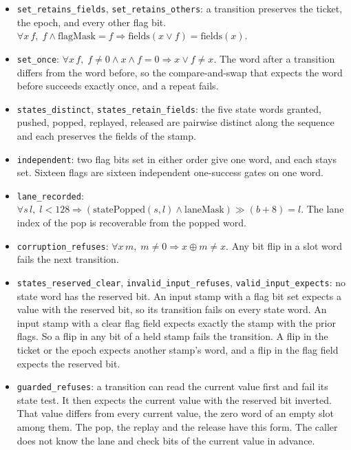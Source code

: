 \begin{itemize}
\item \texttt{set\_\allowbreak{}retains\_\allowbreak{}fields}, \texttt{set\_\allowbreak{}retains\_\allowbreak{}others}: a transition preserves the ticket, the epoch, and every other flag bit. \(\forall x\, f,\; f \land \mathrm{flagMask} = f \Rightarrow \mathrm{fields}(x \lor f) = \mathrm{fields}(x)\).
\item \texttt{set\_\allowbreak{}once}: \(\forall x\, f,\; f \neq 0 \land x \land f = 0 \Rightarrow x \lor f \neq x\). The word after a transition differs from the word before, so the compare-and-swap that expects the word before succeeds exactly once, and a repeat fails.
\item \texttt{states\_\allowbreak{}distinct}, \texttt{states\_\allowbreak{}retain\_\allowbreak{}fields}: the five state words granted, pushed, popped, replayed, released are pairwise distinct along the sequence and each preserves the fields of the stamp.
\item \texttt{independent}: two flag bits set in either order give one word, and each stays set. Sixteen flags are sixteen independent one-success gates on one word.
\item \texttt{lane\_\allowbreak{}recorded}: \(\forall s\, l,\; l < 128 \Rightarrow (\mathrm{statePopped}(s, l) \land \mathrm{laneMask}) \gg (b + 8) = l\). The lane index of the pop is recoverable from the popped word.
\item \texttt{corruption\_\allowbreak{}refuses}: \(\forall x\, m,\; m \neq 0 \Rightarrow x \oplus m \neq x\). Any bit flip in a slot word fails the next transition.
\item \texttt{states\_\allowbreak{}reserved\_\allowbreak{}clear}, \texttt{invalid\_\allowbreak{}input\_\allowbreak{}refuses}, \texttt{valid\_\allowbreak{}input\_\allowbreak{}expects}: no state word has the reserved bit. An input stamp with a flag bit set expects a value with the reserved bit, so its transition fails on every state word. An input stamp with a clear flag field expects exactly the stamp with the prior flags. So a flip in any bit of a held stamp fails the transition. A flip in the ticket or the epoch expects another stamp's word, and a flip in the flag field expects the reserved bit.
\item \texttt{guarded\_\allowbreak{}refuses}: a transition can read the current value first and fail its state test. It then expects the current value with the reserved bit inverted. That value differs from every current value, the zero word of an empty slot among them. The pop, the replay and the release have this form. The caller does not know the lane and check bits of the current value in advance.

\end{itemize}
